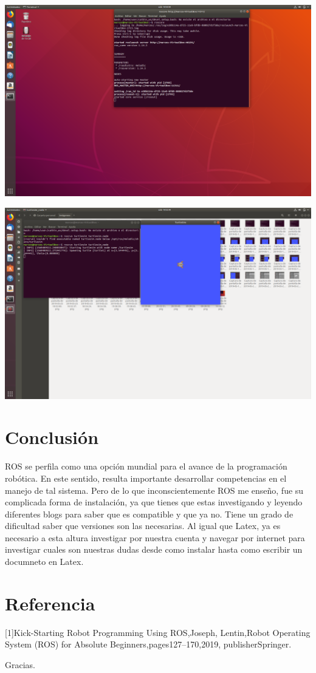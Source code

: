 \documentclass[12pt,a4paper]{report}
\begin{document}
\begin{center}
\includegraphics[scale=.15]{link21.png}
\end{center}
\begin{center}
\includegraphics[scale=.15]{link23.png}
\end{center}
\section{Conclusión}
ROS se perfila como una opción mundial para el avance de la programación robótica. En este sentido, resulta importante desarrollar competencias en el manejo de tal sistema. Pero de lo que inconscientemente ROS me enseño, fue su complicada forma de instalación, ya que tienes que estas investigando y leyendo diferentes blogs para saber que es compatible y que ya no. Tiene un grado de dificultad saber que versiones son las necesarias. Al igual que Latex, ya es necesario a esta altura investigar por nuestra cuenta y navegar por internet para investigar cuales son nuestras dudas desde como instalar hasta como escribir un documneto en Latex.


\section{Referencia}
[1]Kick-Starting Robot Programming Using ROS,Joseph, Lentin,Robot Operating System (ROS) for Absolute Beginners,pages127--170,2019, publisher{Springer}.






\begin{center}
Gracias.
\end{center}
\end{document}
